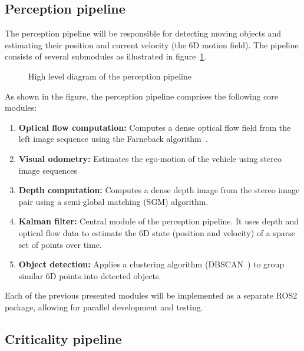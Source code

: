 \subsection{Perception pipeline}\label{sec:PerceptionPipeline}  

The perception pipeline will be responsible for detecting moving objects and estimating their position and current velocity (the 6D motion field). 
The pipeline consists of several submodules as illustrated in figure~\ref{fig:perception_pipeline_high_level}.

\begin{figure}[H]
  \centering
  \resizebox{0.8\textwidth}{!}{}
  \caption{High level diagram of the perception pipeline}\label{fig:perception_pipeline_high_level}
\end{figure}%

As shown in the figure, the perception pipeline comprises the following core modules: 

\begin{enumerate}
  \item \textbf{Optical flow computation:} Computes a dense optical flow field from the left image sequence
  using the Farneback algorithm~\cite{opf_flw_farneback}.

  \item \textbf{Visual odometry:} Estimates the ego-motion of the vehicle using stereo image sequences
  \item \textbf{Depth computation:}  Computes a dense depth image from the stereo image pair using a semi-global
  matching (SGM) algorithm.
  \item \textbf{Kalman filter:}  Central module of the perception pipeline. It uses depth and optical flow data to
  estimate the 6D state (position and velocity) of a sparse set of points over time.
  \item \textbf{Object detection:} Applies a clustering algorithm (\gls{DBSCAN}~\cite{dbscan_original}) to group similar 6D points into
  detected objects.
\end{enumerate}

Each of the previous presented modules will be implemented as a separate ROS2 package, allowing for
parallel development and testing. 

\subsection{Criticality pipeline}\label{sec:CriticallityPipeline}

